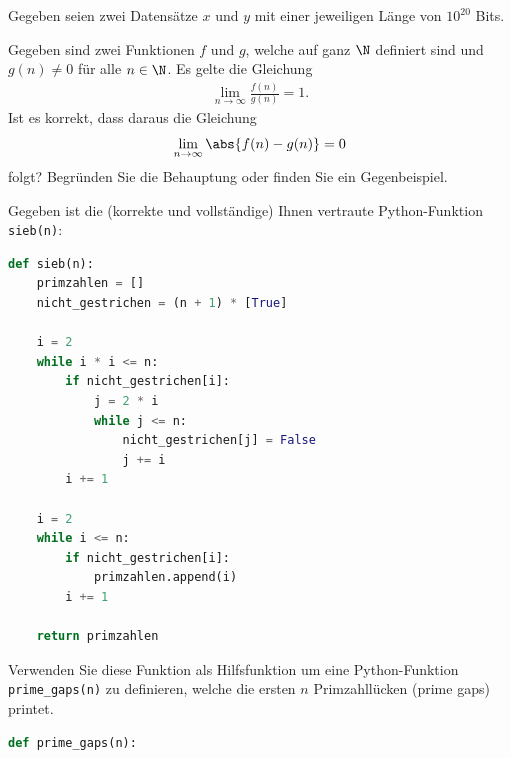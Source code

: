 \begin{questions}
\question Gegeben seien zwei Datensätze $x$ und $y$ mit einer jeweiligen Länge von $10^{20}$ Bits. 
\droptotalpoints

\question[2]
Gegeben sind zwei Funktionen $f$ und $g$, welche auf ganz $\N$ definiert sind und $g(n) \neq 0$ für alle $n\in\N$. Es gelte die Gleichung
\begin{align*}
  \lim_{n\to\infty}\frac{f(n)}{g(n)} = 1.
\end{align*}
Ist es korrekt, dass daraus die Gleichung
\begin{align*}
  \lim_{n\to\infty} \abs{f(n) - g(n)} = 0
\end{align*}
folgt? Begründen Sie die Behauptung oder finden Sie ein Gegenbeispiel.

\clearpage
\question[2]
Gegeben ist die (korrekte und vollständige) Ihnen vertraute Python-Funktion \lstinline|sieb(n)|:
\begin{lstlisting}[language=Python,caption=Sieb,numbers=none]
def sieb(n):
    primzahlen = []
    nicht_gestrichen = (n + 1) * [True]

    i = 2
    while i * i <= n:
        if nicht_gestrichen[i]:
            j = 2 * i
            while j <= n:
                nicht_gestrichen[j] = False
                j += i
        i += 1

    i = 2
    while i <= n:
        if nicht_gestrichen[i]:
            primzahlen.append(i)
        i += 1

    return primzahlen
\end{lstlisting}
Verwenden Sie diese Funktion als Hilfsfunktion um eine Python-Funktion \lstinline|prime_gaps(n)| zu definieren, welche die ersten $n$ Primzahllücken (prime gaps) printet.
\begin{lstlisting}[language=Python,caption=prime gaps (noch zu vervollständigen),numbers=none]
def prime_gaps(n):


\end{lstlisting}
\end{questions}
